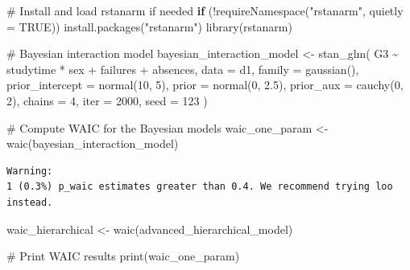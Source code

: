 \documentclass[
  10pt,
]{article}
\newenvironment{Shaded}{\begin{snugshade}}{\end{snugshade}}
\newcommand{\AttributeTok}[1]{\textcolor[rgb]{0.40,0.45,0.13}{#1}}
\newcommand{\CommentTok}[1]{\textcolor[rgb]{0.37,0.37,0.37}{#1}}
\newcommand{\ConstantTok}[1]{\textcolor[rgb]{0.56,0.35,0.01}{#1}}
\newcommand{\ControlFlowTok}[1]{\textcolor[rgb]{0.00,0.23,0.31}{\textbf{#1}}}
\newcommand{\DecValTok}[1]{\textcolor[rgb]{0.68,0.00,0.00}{#1}}
\newcommand{\FloatTok}[1]{\textcolor[rgb]{0.68,0.00,0.00}{#1}}
\newcommand{\FunctionTok}[1]{\textcolor[rgb]{0.28,0.35,0.67}{#1}}
\newcommand{\NormalTok}[1]{\textcolor[rgb]{0.00,0.23,0.31}{#1}}
\newcommand{\OtherTok}[1]{\textcolor[rgb]{0.00,0.23,0.31}{#1}}
\newcommand{\SpecialCharTok}[1]{\textcolor[rgb]{0.37,0.37,0.37}{#1}}
\newcommand{\StringTok}[1]{\textcolor[rgb]{0.13,0.47,0.30}{#1}}
\begin{document}
\begin{Shaded}
\begin{Highlighting}[]
\CommentTok{\# Install and load rstanarm if needed}
\ControlFlowTok{if}\NormalTok{ (}\SpecialCharTok{!}\FunctionTok{requireNamespace}\NormalTok{(}\StringTok{"rstanarm"}\NormalTok{, }\AttributeTok{quietly =} \ConstantTok{TRUE}\NormalTok{)) }\FunctionTok{install.packages}\NormalTok{(}\StringTok{"rstanarm"}\NormalTok{)}
\FunctionTok{library}\NormalTok{(rstanarm)}

\CommentTok{\# Bayesian interaction model}
\NormalTok{bayesian\_interaction\_model }\OtherTok{\textless{}{-}} \FunctionTok{stan\_glm}\NormalTok{(}
\NormalTok{  G3 }\SpecialCharTok{\textasciitilde{}}\NormalTok{ studytime }\SpecialCharTok{*}\NormalTok{ sex }\SpecialCharTok{+}\NormalTok{ failures }\SpecialCharTok{+}\NormalTok{ absences,}
  \AttributeTok{data =}\NormalTok{ d1,}
  \AttributeTok{family =} \FunctionTok{gaussian}\NormalTok{(),}
  \AttributeTok{prior\_intercept =} \FunctionTok{normal}\NormalTok{(}\DecValTok{10}\NormalTok{, }\DecValTok{5}\NormalTok{),}
  \AttributeTok{prior =} \FunctionTok{normal}\NormalTok{(}\DecValTok{0}\NormalTok{, }\FloatTok{2.5}\NormalTok{),}
  \AttributeTok{prior\_aux =} \FunctionTok{cauchy}\NormalTok{(}\DecValTok{0}\NormalTok{, }\DecValTok{2}\NormalTok{),}
  \AttributeTok{chains =} \DecValTok{4}\NormalTok{,}
  \AttributeTok{iter =} \DecValTok{2000}\NormalTok{,}
  \AttributeTok{seed =} \DecValTok{123}
\NormalTok{)}
\end{Highlighting}
\end{Shaded}

\begin{Shaded}
\begin{Highlighting}[]
\CommentTok{\# Compute WAIC for the Bayesian models}
\NormalTok{waic\_one\_param }\OtherTok{\textless{}{-}} \FunctionTok{waic}\NormalTok{(bayesian\_interaction\_model)}
\end{Highlighting}
\end{Shaded}

\begin{verbatim}
Warning: 
1 (0.3%) p_waic estimates greater than 0.4. We recommend trying loo instead.
\end{verbatim}

\begin{Shaded}
\begin{Highlighting}[]
\NormalTok{waic\_hierarchical }\OtherTok{\textless{}{-}} \FunctionTok{waic}\NormalTok{(advanced\_hierarchical\_model)}

\CommentTok{\# Print WAIC results}
\FunctionTok{print}\NormalTok{(waic\_one\_param)}
\end{Highlighting}
\end{Shaded}
\end{document}
